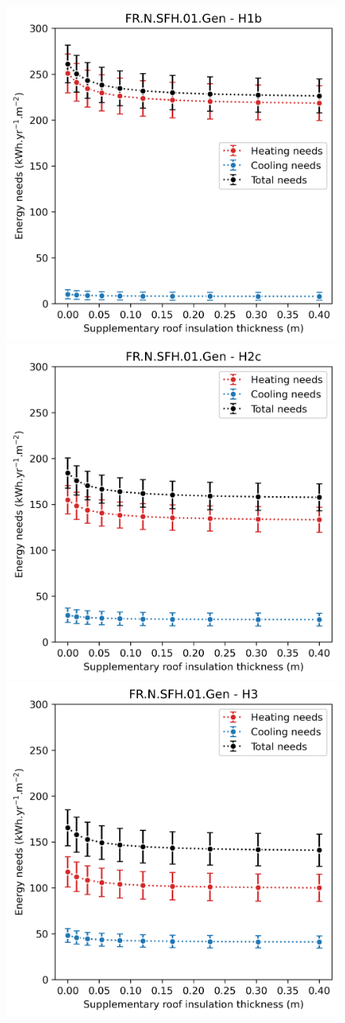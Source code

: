 \documentclass[11pt]{article}
\begin{document}
            \begin{figure}[ht]
                \centering
                \includegraphics[width=0.32\columnwidth]{figures/roof_FR.N.SFH.01.Gen_H1b_conventionnel_th-bce_2020_2000-2020.png}
                \includegraphics[width=0.32\columnwidth]{figures/roof_FR.N.SFH.01.Gen_H2c_conventionnel_th-bce_2020_2000-2020.png}
                \includegraphics[width=0.32\columnwidth]{figures/roof_FR.N.SFH.01.Gen_H3_conventionnel_th-bce_2020_2000-2020.png}\\

\end{figure}
\end{document}
